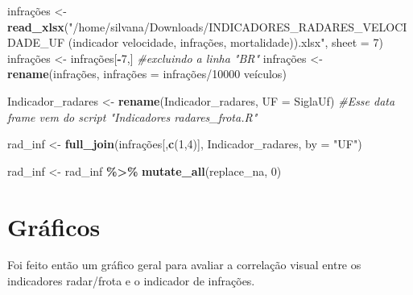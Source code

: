 \documentclass[
]{book}
\newenvironment{Shaded}{\begin{snugshade}}{\end{snugshade}}
\newcommand{\AttributeTok}[1]{\textcolor[rgb]{0.13,0.29,0.53}{#1}}
\newcommand{\CommentTok}[1]{\textcolor[rgb]{0.56,0.35,0.01}{\textit{#1}}}
\newcommand{\DecValTok}[1]{\textcolor[rgb]{0.00,0.00,0.81}{#1}}
\newcommand{\FunctionTok}[1]{\textcolor[rgb]{0.13,0.29,0.53}{\textbf{#1}}}
\newcommand{\NormalTok}[1]{#1}
\newcommand{\OtherTok}[1]{\textcolor[rgb]{0.56,0.35,0.01}{#1}}
\newcommand{\SpecialCharTok}[1]{\textcolor[rgb]{0.81,0.36,0.00}{\textbf{#1}}}
\newcommand{\StringTok}[1]{\textcolor[rgb]{0.31,0.60,0.02}{#1}}
\begin{document}
\begin{Shaded}
\begin{Highlighting}[]
\NormalTok{infrações }\OtherTok{\textless{}{-}} \FunctionTok{read\_xlsx}\NormalTok{(}\StringTok{"/home/silvana/Downloads/INDICADORES\_RADARES\_VELOCIDADE\_UF (indicador velocidade, infrações, mortalidade)).xlsx"}\NormalTok{, }\AttributeTok{sheet =} \DecValTok{7}\NormalTok{)}
\NormalTok{infrações }\OtherTok{\textless{}{-}}\NormalTok{ infrações[}\SpecialCharTok{{-}}\DecValTok{7}\NormalTok{,] }\CommentTok{\#excluindo a linha "BR"}
\NormalTok{infrações }\OtherTok{\textless{}{-}} \FunctionTok{rename}\NormalTok{(infrações, infrações }\OtherTok{=} \StringTok{\textasciigrave{}}\AttributeTok{infrações/10000 veículos}\StringTok{\textasciigrave{}}\NormalTok{)}

\NormalTok{Indicador\_radares }\OtherTok{\textless{}{-}} \FunctionTok{rename}\NormalTok{(Indicador\_radares, }\AttributeTok{UF =}\NormalTok{ SiglaUf) }\CommentTok{\#Esse data frame vem do script "Indicadores radares\_frota.R"}

\NormalTok{rad\_inf }\OtherTok{\textless{}{-}} \FunctionTok{full\_join}\NormalTok{(infrações[,}\FunctionTok{c}\NormalTok{(}\DecValTok{1}\NormalTok{,}\DecValTok{4}\NormalTok{)], Indicador\_radares, }\AttributeTok{by =} \StringTok{"UF"}\NormalTok{)}

\NormalTok{rad\_inf }\OtherTok{\textless{}{-}}\NormalTok{ rad\_inf }\SpecialCharTok{\%\textgreater{}\%} 
  \FunctionTok{mutate\_all}\NormalTok{(replace\_na, }\DecValTok{0}\NormalTok{)}
\end{Highlighting}
\end{Shaded}

\section{Gráficos}\label{gruxe1ficos}

Foi feito então um gráfico geral para avaliar a correlação visual entre os indicadores radar/frota e o indicador de infrações.
\end{document}
